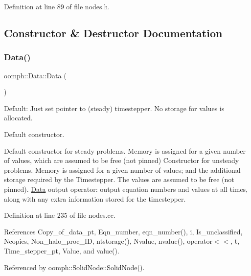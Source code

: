 Definition at line 89 of file nodes.\+h.



\subsection{Constructor \& Destructor Documentation}
\mbox{\label{classoomph_1_1Data_acbecfbd1dd3af51da9facdd897b64e74}} 
\subsubsection{\texorpdfstring{Data()}{Data()}\hspace{0.1cm}{\footnotesize\ttfamily [1/4]}}
{\footnotesize\ttfamily oomph\+::\+Data\+::\+Data (\begin{DoxyParamCaption}{ }\end{DoxyParamCaption})}



Default\+: Just set pointer to (steady) timestepper. No storage for values is allocated. 

Default constructor.

Default constructor for steady problems. Memory is assigned for a given number of values, which are assumed to be free (not pinned) Constructor for unsteady problems. Memory is assigned for a given number of values; and the additional storage required by the Timestepper. The values are assumed to be free (not pinned). \hyperlink{classoomph_1_1Data}{Data} output operator\+: output equation numbers and values at all times, along with any extra information stored for the timestepper. 

Definition at line 235 of file nodes.\+cc.



References Copy\+\_\+of\+\_\+data\+\_\+pt, Eqn\+\_\+number, eqn\+\_\+number(), i, Is\+\_\+unclassified, Ncopies, Non\+\_\+halo\+\_\+proc\+\_\+\+ID, ntstorage(), Nvalue, nvalue(), operator$<$$<$, t, Time\+\_\+stepper\+\_\+pt, Value, and value().



Referenced by oomph\+::\+Solid\+Node\+::\+Solid\+Node().

\mbox{\label{classoomph_1_1Data_a352ab3876876780d366866704a29dbb0}} 
